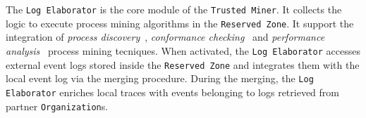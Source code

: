 The \texttt{Log Elaborator} is the core module of the \texttt{Trusted Miner}. It collects the logic to execute process mining algorithms in the \texttt{Reserved Zone}. It support the integration of \textit{process discovery}~\cite{citation}, \textit{conformance checking}~\cite{citation} and \textit{performance analysis}~\cite{ciation} process mining tecniques. When activated, the \texttt{Log Elaborator} %
accesses external event logs stored inside the \texttt{Reserved Zone} and integrates them with the local event log via the merging procedure. %
During the merging, the \texttt{Log Elaborator} enriches local traces with events belonging to logs retrieved from partner \texttt{Organization}s.


